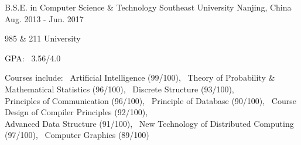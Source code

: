 

\begin{cventries}

  \cventry
    {B.S.E. in Computer Science \& Technology} %
    {Southeast University} %
    {Nanjing, China} %
    {Aug. 2013 - Jun. 2017} %
    {
      \begin{cvitems} %
        \item {985 \& 211 University}
        \item {GPA: \ 3.56/4.0}
        \item {Courses include: \ Artificial Intelligence (99/100), \ Theory of Probability \& Mathematical Statistics (96/100), \  Discrete Structure (93/100), \\ Principles of Communication (96/100), \ Principle of Database (90/100), \ Course Design of Compiler Principles (92/100)}, \\ Advanced Data Structure (91/100), \ New Technology of Distributed Computing (97/100), \  Computer Graphics (89/100)
      \end{cvitems} 
    }
    
\end{cventries}